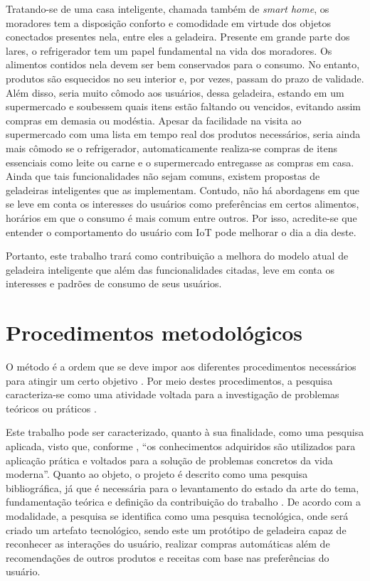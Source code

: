 Tratando-se de uma casa inteligente, chamada também de \textit{smart home}, os moradores tem a disposição conforto e comodidade em virtude dos objetos conectados presentes nela, entre eles a geladeira. Presente em grande parte dos lares, o refrigerador tem um papel fundamental na vida dos moradores. Os alimentos contidos nela devem ser bem conservados para o consumo. No entanto, produtos são esquecidos no seu interior e, por vezes, passam do prazo de validade. Além disso, seria muito cômodo aos usuários, dessa geladeira, estando em um supermercado e soubessem quais itens estão faltando ou vencidos, evitando assim compras em demasia ou modéstia. Apesar da facilidade na visita ao supermercado com uma lista em tempo real dos produtos necessários, seria ainda mais cômodo se o refrigerador, automaticamente realiza-se compras de itens essenciais como leite ou carne e o supermercado entregasse as compras em casa. Ainda que tais funcionalidades não sejam comuns, existem propostas de geladeiras inteligentes que as implementam. Contudo, não há abordagens em que se leve em conta os interesses do usuários como preferências em certos alimentos, horários em que o consumo é mais comum entre outros. Por isso, acredite-se que entender o comportamento do usuário com IoT pode melhorar o dia a dia deste.

Portanto, este trabalho trará como contribuição a melhora do modelo atual de geladeira inteligente que além das funcionalidades citadas, leve em conta os interesses e padrões de consumo de seus usuários.





\section{Procedimentos metodológicos}

O método é a ordem que se deve impor aos diferentes procedimentos necessários para atingir um certo objetivo \cite{Cervo2007}. Por meio destes procedimentos, a pesquisa caracteriza-se como uma atividade voltada para a investigação de problemas teóricos ou práticos \cite{Matias-Pereira2012}.

Este trabalho pode ser caracterizado, quanto à sua finalidade, como uma pesquisa aplicada, visto que, conforme , ``os conhecimentos adquiridos são utilizados para aplicação prática e voltados para a solução de problemas concretos da vida moderna''. Quanto ao objeto, o projeto é descrito como uma pesquisa bibliográfica, já que é necessária para o levantamento do estado da arte do tema, fundamentação teórica e definição da contribuição do trabalho \cite{Matias-Pereira2012}. De acordo com a modalidade, a pesquisa se identifica como uma pesquisa tecnológica, onde será criado um artefato tecnológico, sendo este um protótipo de geladeira capaz de reconhecer as interações do usuário, realizar compras automáticas além de recomendações de outros produtos e receitas com base nas preferências do usuário. 

